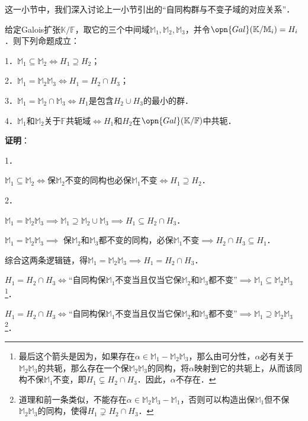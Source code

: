 这一小节中，我们深入讨论上一小节引出的“自同构群与不变子域的对应关系”．

\begin{theorem}{}
给定Galois扩张$\mathbb{K}/\mathbb{F}$，取它的三个中间域$\mathbb{M}_1, \mathbb{M}_2, \mathbb{M}_3$，并令$\opn{Gal}(\mathbb{K}/\mathbb{M}_i)=H_i$．则下列命题成立：

1．$\mathbb{M}_1\subseteq \mathbb{M}_2 \iff H_1\supseteq H_2$；

2．$\mathbb{M}_1=\mathbb{M}_2\mathbb{M}_3 \iff H_1=H_2\cap H_3$；

3．$\mathbb{M}_1=\mathbb{M}_2\cap\mathbb{M}_3 \iff H_1$是包含$H_2\cup H_3$的最小的群．

4．$\mathbb{M}_1$和$\mathbb{M}_2$关于$\mathbb{F}$共轭域$\iff H_1$和$H_2$在$\opn{Gal}(\mathbb{K}/\mathbb{F})$中共轭．

\end{theorem}

\textbf{证明}：

1．

$\mathbb{M}_1\subseteq\mathbb{M}_2 \iff$保$\mathbb{M}_2$不变的同构也必保$\mathbb{M}_1$不变$\iff H_1\supseteq H_2$．

2．

$\mathbb{M}_1=\mathbb{M}_2\mathbb{M}_3\implies \mathbb{M}_1\supseteq\mathbb{M}_2\cup\mathbb{M}_3\implies H_1\subseteq H_2\cap H_3$．

$\mathbb{M}_1=\mathbb{M}_2\mathbb{M}_3\implies$ 保$\mathbb{M}_2$和$\mathbb{M}_3$都不变的同构，必保$\mathbb{M}_1$不变$\implies H_2\cap H_3\subseteq H_1$．

综合这两条逻辑链，得$\mathbb{M}_1=\mathbb{M}_2\mathbb{M}_3 \implies H_1=H_2\cap H_3$．

$H_1=H_2\cap H_3\iff$“自同构保$\mathbb{M}_1$不变当且仅当它保$\mathbb{M}_2$和$\mathbb{M}_3$都不变”$\implies \mathbb{M}_1\subseteq\mathbb{M}_2\mathbb{M}_3$\footnote{最后这个箭头是因为，如果存在$\alpha\in\mathbb{M}_1-\mathbb{M}_2\mathbb{M}_3$，那么由可分性，$\alpha$必有关于$\mathbb{M}_2\mathbb{M}_3$的共轭，那么存在一个保$\mathbb{M}_2\mathbb{M}_3$的同构，将$\alpha$映射到它的共轭上，从而该同构不保$\mathbb{M}_1$不变，即$H_1\subsetneq H_2\cap H_3$．因此，$\alpha$不存在．}．

$H_1=H_2\cap H_3\iff$“自同构保$\mathbb{M}_1$不变当且仅当它保$\mathbb{M}_2$和$\mathbb{M}_3$都不变”$\implies \mathbb{M}_1\supseteq\mathbb{M}_2\mathbb{M}_3$\footnote{道理和前一条类似，不能存在$\alpha\in\mathbb{M}_2\mathbb{M}_3-\mathbb{M}_1$，否则可以构造出保$\mathbb{M}_1$但不保$\mathbb{M}_2\mathbb{M}_3$的同构，使得$H_1\supsetneq H_2\cap H_3$．}．


